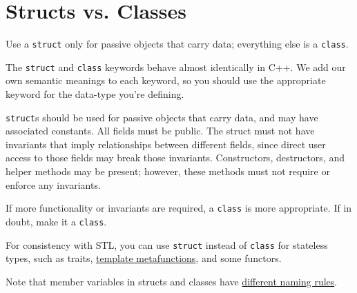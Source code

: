 
\section{Structs vs. Classes}\label{sec:structs-vs.-classes}
Use a \texttt{struct} only for passive objects that carry data; everything else is a \texttt{class}.

The \texttt{struct} and \texttt{class} keywords behave almost identically in C++. We add our own semantic meanings to each keyword, so you should use the appropriate keyword for the data-type you're defining.

\texttt{struct}s should be used for passive objects that carry data, and may have associated constants. All fields must be public. The struct must not have invariants that imply relationships between different fields, since direct user access to those fields may break those invariants. Constructors, destructors, and helper methods may be present; however, these methods must not require or enforce any invariants.

If more functionality or invariants are required, a \texttt{class} is more appropriate. If in doubt, make it a \texttt{class}.

For consistency with STL, you can use \texttt{struct} instead of \texttt{class} for stateless types, such as traits, \hyperref[sec:template-metaprogramming]{template metafunctions}, and some functors.

Note that member variables in structs and classes have \hyperref[sec:variable-names]{different naming rules}.
